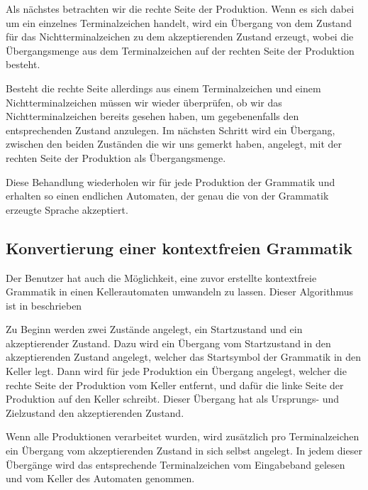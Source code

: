 Als nächstes betrachten wir die rechte Seite der Produktion. Wenn es sich dabei
um ein einzelnes Terminalzeichen handelt, wird ein Übergang von dem Zustand für
das Nichtterminalzeichen zu dem akzeptierenden Zustand erzeugt, wobei die
Übergangsmenge aus dem Terminalzeichen auf der rechten Seite der Produktion
besteht.\vspace{10pt}

Besteht die rechte Seite allerdings aus einem Terminalzeichen und einem
Nichtterminalzeichen müssen wir wieder überprüfen, ob wir das
Nichtterminalzeichen bereits gesehen haben, um gegebenenfalls den
entsprechenden Zustand anzulegen. Im nächsten Schritt wird ein Übergang,
zwischen den beiden Zuständen die wir uns gemerkt haben, angelegt, mit der
rechten Seite der Produktion als Übergangsmenge.\vspace{10pt}

Diese Behandlung wiederholen wir für jede Produktion der Grammatik und
erhalten so einen endlichen Automaten, der genau die von der
Grammatik erzeugte Sprache akzeptiert.\vspace{10pt}


\subsection{Konvertierung einer kontextfreien Grammatik}\label{ConverToGrammarContextFree}

Der Benutzer hat auch die Möglichkeit, eine zuvor erstellte kontextfreie
Grammatik in einen Kellerautomaten umwandeln zu lassen. Dieser
Algorithmus ist in \cite{Compilers} beschrieben\vspace{10pt}

Zu Beginn werden zwei Zustände angelegt, ein Startzustand und ein
akzeptierender Zustand. Dazu wird ein Übergang vom Startzustand in den
akzeptierenden Zustand angelegt, welcher das Startsymbol der Grammatik in den
Keller legt. Dann wird für jede Produktion ein Übergang angelegt, welcher die rechte
Seite der Produktion vom Keller entfernt, und dafür die linke Seite der
Produktion auf den Keller schreibt. Dieser Übergang hat als
Ursprungs- und Zielzustand den akzeptierenden Zustand.\vspace{10pt}

Wenn alle Produktionen verarbeitet wurden, wird zusätzlich pro Terminalzeichen
ein Übergang vom akzeptierenden Zustand in sich selbst angelegt.
In jedem dieser Übergänge wird das entsprechende Terminalzeichen vom Eingabeband
gelesen und vom Keller des Automaten genommen.\vspace{10pt}

